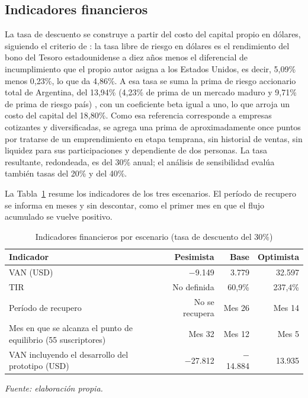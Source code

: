\subsection{Indicadores financieros}
\label{sec:viabilidad-indicadores}

La tasa de descuento se construye a partir del costo del capital propio en dólares, siguiendo el criterio de \textcite{Damodaran2026}: la tasa libre de riesgo en dólares es el rendimiento del bono del Tesoro estadounidense a diez años menos el diferencial de incumplimiento que el propio autor asigna a los Estados Unidos, es decir, 5,09\% \parencite{USTreasury2026} menos 0,23\%, lo que da 4,86\%. A esa tasa se suma la prima de riesgo accionario total de Argentina, del 13,94\% (4,23\% de prima de un mercado maduro y 9,71\% de prima de riesgo país) \parencite{Damodaran2026}, con un coeficiente beta igual a uno, lo que arroja un costo del capital del 18,80\%. Como esa referencia corresponde a empresas cotizantes y diversificadas, se agrega una prima de aproximadamente once puntos por tratarse de un emprendimiento en etapa temprana, sin historial de ventas, sin liquidez para sus participaciones y dependiente de dos personas. La tasa resultante, redondeada, es del 30\% anual; el análisis de sensibilidad evalúa también tasas del 20\% y del 40\%.

La Tabla~\ref{tab:viabilidad-indicadores} resume los indicadores de los tres escenarios. El período de recupero se informa en meses y sin descontar, como el primer mes en que el flujo acumulado se vuelve positivo.

\begin{table}[!htbp]
\centering
\caption{Indicadores financieros por escenario (tasa de descuento del 30\%)}
\label{tab:viabilidad-indicadores}
\renewcommand{\arraystretch}{1.3}
\footnotesize
\setlength{\tabcolsep}{4pt}
\begin{tabular}{|m{5.2cm}|r|r|r|}
\hline
\textbf{Indicador} & \textbf{Pesimista} & \textbf{Base} & \textbf{Optimista} \\
\hline
VAN (USD) & $-$9.149 & 3.779 & 32.597 \\
\hline
TIR & No definida & 60,9\% & 237,4\% \\
\hline
Período de recupero & No se recupera & Mes 26 & Mes 14 \\
\hline
Mes en que se alcanza el punto de equilibrio (55 suscriptores) & Mes 32 & Mes 12 & Mes 5 \\
\hline
VAN incluyendo el desarrollo del prototipo (USD) & $-$27.812 & $-$14.884 & 13.935 \\
\hline
\end{tabular}

\smallskip
\noindent\textit{Fuente: elaboración propia.}
\end{table}

